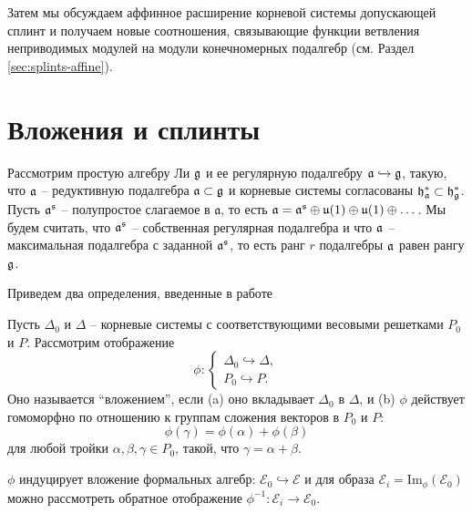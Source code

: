 Затем мы обсуждаем аффинное расширение корневой системы допускающей сплинт и получаем новые соотношения, связывающие функции ветвления неприводимых модулей на модули конечномерных подалгебр (см. Раздел \ref{sec:splints-affine}).

\section{Вложения и сплинты}

\label{sec:Injections and splints}

Рассмотрим простую алгебру Ли $\mathfrak{g}$ и ее  регулярную подалгебру $\mathfrak{a} \hookrightarrow \mathfrak{g}$, такую, что $\mathfrak{a}$ -- редуктивную подалгебра $\mathfrak{a}\subset \mathfrak{g}$ и корневые системы согласованы $\mathfrak{h}_{\mathfrak{a}}^{\ast}\subset\mathfrak{h}_{\mathfrak{g}}^{\ast}$. Пусть $\mathfrak{a}^{\mathfrak{s}}$ -- полупростое слагаемое в $\mathfrak{a}$, то есть  $\mathfrak{a}=\mathfrak{a}^{\mathfrak{s}} \oplus \mathfrak{u}(1)\oplus \mathfrak{u}(1)\oplus \dots$. Мы будем считать, что $\mathfrak{a}^{\mathfrak{s}}$ -- собственная регулярная подалгебра и что $\mathfrak{a}$ -- максимальная подалгебра с заданной  $\mathfrak{a}^{\mathfrak{s}}$, то есть ранг $r$ подалгебры $\mathfrak{a}$ равен рангу $\mathfrak{g}$.

Приведем два определения, введенные в работе \cite{richter2008splints}

\begin{definition}
Пусть $\Delta _{0}$ и $\Delta$ -- корневые системы с соответствующими весовыми решетками $P_{0}$ и $P$. Рассмотрим отображение
\begin{equation}
\phi :\left\{
\begin{array}{l}
\Delta _{0}\hookrightarrow \Delta , \\
P_{0}\hookrightarrow P.
\end{array}
\right.
\end{equation}
Оно называется ``вложением'', если \newline
\noindent (a) оно вкладывает $\Delta _{0}$ в $\Delta $, и \newline
\noindent (b) $\phi$ действует гомоморфно по отношению к группам сложения векторов в $P_{0}$ и $P$:
\[
\phi (\gamma )=\phi (\alpha )+\phi (\beta )
\]
для любой тройки $\alpha ,\beta ,\gamma \in P_{0}$, такой, что $\gamma =\alpha+\beta $.
\end{definition}

$\phi$ индуцирует вложение формальных алгебр: ${\mathcal{E}}_0\hookrightarrow \mathcal{E}$ и для образа ${\mathcal{E}}_i=\mathrm{Im}_{\phi}\left( {\mathcal{E}}_0\right)$ можно рассмотреть обратное отображение $\phi^{-1}:{\mathcal{E}}_i \longrightarrow {\mathcal{E}}_0$.

